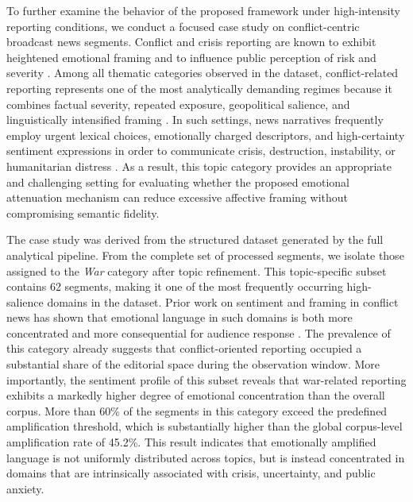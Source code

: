 \documentclass[final,1p,times]{elsarticle}
\begin{document}
To further examine the behavior of the proposed framework under high-intensity reporting conditions, we conduct a focused case study on conflict-centric broadcast news segments. Conflict and crisis reporting are known to exhibit heightened emotional framing and to influence public perception of risk and severity \cite{hase2022emotions,coombs2024emotions,burton2025anxiety}. Among all thematic categories observed in the dataset, conflict-related reporting represents one of the most analytically demanding regimes because it combines factual severity, repeated exposure, geopolitical salience, and linguistically intensified framing \cite{acquaful2024framing}. In such settings, news narratives frequently employ urgent lexical choices, emotionally charged descriptors, and high-certainty sentiment expressions in order to communicate crisis, destruction, instability, or humanitarian distress \cite{sacyaten2025crisis,dylong2023framing}. As a result, this topic category provides an appropriate and challenging setting for evaluating whether the proposed emotional attenuation mechanism can reduce excessive affective framing without compromising semantic fidelity.

The case study was derived from the structured dataset generated by the full analytical pipeline. From the complete set of processed segments, we isolate those assigned to the \textit{War} category after topic refinement. This topic-specific subset contains 62 segments, making it one of the most frequently occurring high-salience domains in the dataset. Prior work on sentiment and framing in conflict news has shown that emotional language in such domains is both more concentrated and more consequential for audience response \cite{arora2025sentiment}. The prevalence of this category already suggests that conflict-oriented reporting occupied a substantial share of the editorial space during the observation window. More importantly, the sentiment profile of this subset reveals that war-related reporting exhibits a markedly higher degree of emotional concentration than the overall corpus. More than 60\% of the segments in this category exceed the predefined amplification threshold, which is substantially higher than the global corpus-level amplification rate of 45.2\%. This result indicates that emotionally amplified language is not uniformly distributed across topics, but is instead concentrated in domains that are intrinsically associated with crisis, uncertainty, and public anxiety.
\end{document}
